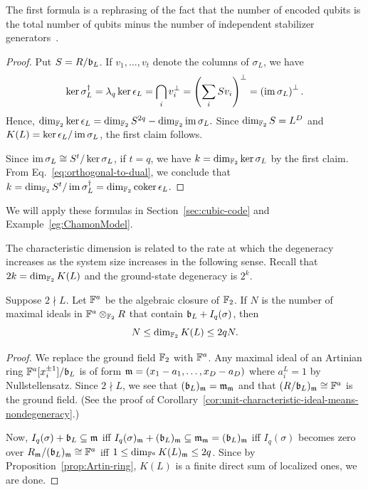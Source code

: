 \noindent
The first formula is a rephrasing of the fact that the number of encoded qubits
is the total number of qubits minus the number of independent stabilizer 
generators~\cite{Gottesman1996Saturating,CalderbankRainsShorEtAl1997Quantum}.
\begin{proof}
Put $S = R/\mathfrak{b}_L$. 
If $v_1,\ldots, v_t$ denote the columns of $\sigma_L$, we have
\begin{equation}
\ker \sigma_L^\dagger = \lambda_q \ker \epsilon_L 
= \bigcap_i v_i^\perp = \left( \sum_i S v_i \right)^\perp = \left( \mathop{\mathrm{im}}\nolimits \sigma_L \right)^\perp.
\label{eq:orthogonal-to-dual}
\end{equation}
Hence, $\dim_{\mathbb{F}_2} \ker \epsilon_L = \dim_{\mathbb{F}_2} S^{2q} - \dim_{\mathbb{F}_2} \mathop{\mathrm{im}}\nolimits \sigma_L.$
Since $\dim_{\mathbb{F}_2} S = L^D$ and $K(L) = \ker \epsilon_L / \mathop{\mathrm{im}}\nolimits \sigma_L$,
the first claim follows.

Since $\mathop{\mathrm{im}}\nolimits \sigma_L \cong S^t / \ker \sigma_L$, if $t=q$,
we have $k = \dim_{\mathbb{F}_2} \ker \sigma_L$ by the first claim.
From Eq.~\eqref{eq:orthogonal-to-dual}, we conclude that 
$k = \dim_{\mathbb{F}_2} S^t / \mathop{\mathrm{im}}\nolimits \sigma_L^\dagger = \dim_{\mathbb{F}_2} \mathop{\mathrm{coker}}\nolimits \epsilon_L$.
\end{proof}
\noindent We will apply these formulas in Section~\ref{sec:cubic-code} and Example~\ref{eg:ChamonModel}.

The characteristic dimension is related to the rate at which
the degeneracy increases as the system size increases
in the following sense.
Recall that $2k = \dim_{\mathbb{F}_2} K(L)$ and the ground-state degeneracy is $2^k$.
\begin{lem}
Suppose $2 \nmid L$. Let $\mathbb{F}^a$ be the algebraic closure of $\mathbb{F}_2$.
If $N$ is the number of maximal ideals in $\mathbb{F}^a \otimes_{\mathbb{F}_2} R$ 
that contain $\mathfrak{b}_L + I_q(\sigma)$, 
then
\[
N \le \dim_{\mathbb{F}_2} K(L) \le 2q N.
\]
\label{lem:K-L-number-points}
\end{lem}
\begin{proof}
We replace the ground field $\mathbb{F}_2$ with $\mathbb{F}^a$.
Any maximal ideal of an Artinian ring $\mathbb{F}^a[x_i^{\pm 1}]/\mathfrak{b}_L$ is of form
$\mathfrak{m} = (x_1 - a_1, \ldots, x_D - a_D)$ where $a_i^L = 1$ by Nullstellensatz.
Since $2 \nmid L$, we see that $(\mathfrak{b}_L)_{\mathfrak{m}} = \mathfrak{m}_{\mathfrak{m}}$ 
and that $(R/\mathfrak{b}_L)_{\mathfrak{m}} \cong \mathbb{F}^a$ is the ground field.
(See the proof of Corollary~\ref{cor:unit-characteristic-ideal-means-nondegeneracy}.)

Now, $I_q(\sigma) + \mathfrak{b}_L \subseteq \mathfrak{m}$
iff $I_q(\sigma)_{\mathfrak{m}} + (\mathfrak{b}_L)_{\mathfrak{m}} \subseteq \mathfrak{m}_{\mathfrak{m}} = (\mathfrak{b}_L)_{\mathfrak{m}}$
iff $I_q(\sigma)$ becomes zero over $R_{\mathfrak{m}} / (\mathfrak{b}_L)_{\mathfrak{m}} \cong \mathbb{F}^a$
iff $1 \le \dim_{\mathbb{F}^a} K(L)_{\mathfrak{m}} \le 2q$.
Since by Proposition~\ref{prop:Artin-ring},
$K(L)$ is a finite direct sum of localized ones,
we are done.
\end{proof}

